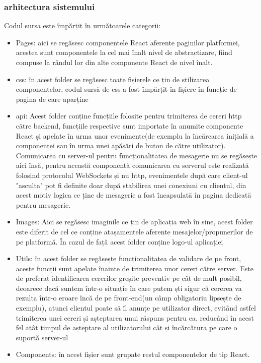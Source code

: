 \documentclass[12pt,a4paper,hidelinks]{report}
\theoremstyle{definition}
\theoremstyle{remark}
\begin{document}
\subsubsection{arhitectura sistemului}
Codul sursa este împărțit în următoarele categorii:
\begin{itemize}
    \item Pages: aici se regăsesc componentele React aferente paginilor platformei,
    acestea sunt componentele la cel mai înalt nivel de abstractizare, fiind compuse la rândul lor
    din alte componente React de nivel înalt.
    \item css: în acest folder se regăsesc toate fișierele ce țin de stilizarea componentelor, codul sursă de css
    a fost împărțit în fișiere în funcție de pagina de care aparține
    \item api: Acest folder conține funcțiile folosite pentru trimiterea de cereri http către backend, funcțiile respective sunt importate în anumite componente React 
    și apelate în urma unor evenimente(de exemplu la încărcarea inițială a componentei sau în urma unei apăsări de buton de către utilizator). 
    Comunicarea cu server-ul pentru funcționalitatea de mesagerie nu se regăsește aici însă, pentru această componentă comunicarea cu serverul este realizată folosind protocolul 
    WebSockets și nu http, evenimentele după care client-ul "asculta" pot fi definite doar după stabilirea unei conexiuni cu clientul, din acest motiv
    logica ce ține de mesagerie a fost încapsulată în pagina dedicată pentru mesagerie.
    \item Images: Aici se regăsesc imaginile ce țin de aplicația web în sine, acest folder este diferit de cel ce conține 
    atașamentele aferente mesajelor/propunerilor de pe platformă. În cazul de față acest folder conține logo-ul aplicației
    \item Utils: în acest folder se regăsește funcționalitatea de validare de pe front, aceste funcții sunt apelate înainte de trimiterea unor cereri către server. 
    Este de preferat identificarea cererilor greșite preventiv pe cât de mult posibil, deoarece dacă suntem într-o situație în care putem ști sigur că cererea va rezulta într-o eroare încă de pe front-end(un câmp obligatoriu lipsește de exemplu), 
    atunci clientul poate să îl anunțe pe utilizator direct, evitând astfel trimiterea unei cereri și așteptarea unui răspuns pentru ea.
    reducând în acest fel atât timpul de așteptare al utilizatorului cât și încărcătura pe care o suportă server-ul
    \item Components: în acest fișier sunt grupate restul componentelor de tip React.

\end{itemize}
\end{document}
